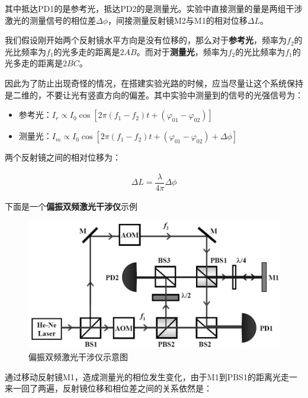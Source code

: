 \documentclass{ctexart}
\begin{document}
其中抵达PD1的是参考光，抵达PD2的是测量光。实验中直接测量的量是两组干涉激光的测量信号的相位差$\Delta \phi$，间接测量反射镜M2与M1的相对位移$\Delta L$。

我们假设刚开始两个反射镜水平方向是没有位移的，那么对于\textbf{参考光}，频率为$f_2$的光比频率为$f_1$的光多走的距离是$2 \overline{AB}$。而对于\textbf{测量光}，频率为$f_2$的光比频率为$f_1$的光多走的距离是$2 \overline{BC}$。

因此为了防止出现奇怪的情况，在搭建实验光路的时候，应当尽量让这个系统保持是二维的，不要让光有竖直方向的偏差。其中实验中测量到的信号的光强信号为：

\begin{itemize}
\item 参考光：$I_r \propto I_0 \cos \left[ 2 \pi \left( f_1 - f_2 \right)t + \left( \varphi_{01} - \varphi_{02} \right) \right] $
\item 测量光：$I_m \propto I_0 \cos \left[ 2 \pi \left( f_1 - f_2 \right)t + \left( \varphi_{01} - \varphi_{02} \right) + \Delta \phi \right] $
\end{itemize}

两个反射镜之间的相对位移为：

\begin{equation*}
  \begin{aligned}
    \Delta L = \dfrac{\lambda}{4 \pi} \Delta \phi 
  \end{aligned}
\end{equation*}

下面是一个\textbf{偏振双频激光干涉仪}示例

\begin{figure}[H]
  \centering
  \includegraphics[width=0.9\linewidth]{figures/偏振双频激光干涉仪}
  \caption{偏振双频激光干涉仪示意图}
\end{figure}

通过移动反射镜M1，造成测量光的相位发生变化，由于M1到PBS1的距离光走一来一回了两遍，反射镜位移和相位差之间的关系依然是：
\end{document}
